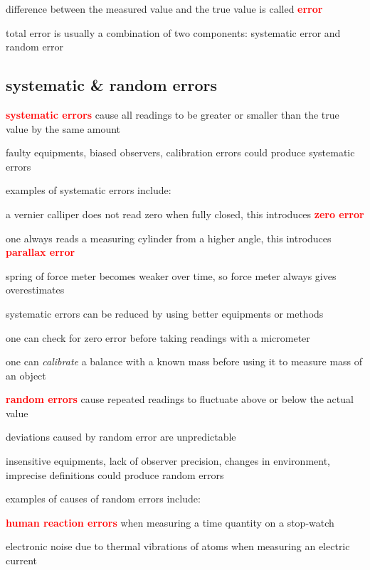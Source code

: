\documentclass[a4paper,12pt]{book}
\newcounter{example}[chapter]
\newcommand{\cmt}{}
\newenvironment{ilight}
  {\centering
  	\vspace*{6pt}
  	\begin{tcolorbox}[colframe=Gray,colback=LightGrey!15]
  \setlength{\baselineskip}{\baselineskip}%
  }
  {\end{tcolorbox}\vspace*{-4pt}}
\newcommand{\keypoint}[1]{\textbf{\textcolor{red}{#1}}}
\newcommand{\titem}{\item}
\newcommand{\keypoint}[1]{\textbf{\textcolor{red}{#1}}}
\newcommand{\cmt}{}
\begin{document}
difference between the measured value and the true value is called \keypoint{error}

total error is usually a combination of two components: systematic error and random error

\subsection{systematic \& random errors}

\begin{ilight}
	\keypoint{systematic errors} cause all readings to be greater or smaller than the true value by the same amount
\end{ilight}

\cmt faulty equipments, biased observers, calibration errors could produce systematic errors

examples of systematic errors include:

\titem a vernier calliper does not read zero when fully closed, this introduces \keypoint{zero error}

\titem one always reads a measuring cylinder from a higher angle, this introduces \keypoint{parallax error}

\titem spring of force meter becomes weaker over time, so force meter always gives overestimates

\cmt systematic errors can be reduced by using better equipments or methods

\titem one can check for zero error before taking readings with a micrometer

\titem one can \emph{calibrate} a balance with a known mass before using it to measure mass of an object

\begin{ilight}
	\centering \keypoint{random errors} cause repeated readings to fluctuate above or below the actual value
\end{ilight}

\cmt deviations caused by random error are unpredictable

\cmt insensitive equipments, lack of observer precision, changes in environment, imprecise definitions could produce random errors

examples of causes of random errors include:

\titem \keypoint{human reaction errors} when measuring a time quantity on a stop-watch

\titem electronic noise due to thermal vibrations of atoms when measuring an electric current
\end{document}
